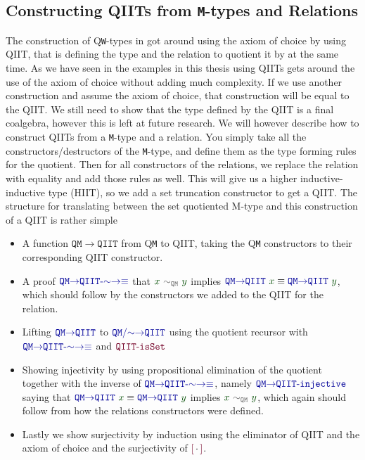 \documentclass[twoside,11pt,openright]{report}
\theoremstyle{plain} %
\theoremstyle{definition}
\theoremstyle{remark}
\newcommand*{\term}[1]{\textcolor{green!30!black}{#1}} %
\newcommand*{\relation}[1]{\textcolor{gray!75!black}{\ensuremath{\mathtt{#1}}}}
\newcommand*{\function}[1]{\textcolor{blue!60!black}{\ensuremath{\mathtt{#1}}}}
\newcommand*{\constructor}[1]{\textcolor{purple!60!black}{\ensuremath{\mathtt{#1}}}}
\newcommand*{\quotientconstructor}[1]{\constructor{[}\,#1\,\constructor{]}}
\begin{document}
\subsection{Constructing QIITs from \texttt{M}-types and Relations}
The construction of Q\texttt{W}-types in \cite{DBLP:Constructing-QIITs} got around using the axiom of choice by using QIIT, that is defining the type and the relation to quotient it by at the same time. As we have seen in the examples in this thesis using QIITs gets around the use of the axiom of choice without adding much complexity. If we use another construction and assume the axiom of choice, that construction will be equal to the QIIT. We still need to show that the type defined by the QIIT is a final coalgebra, however this is left at future research. We will however describe how to construct QIITs from a \texttt{M}-type and a relation. You simply take all the constructors/destructors of the \texttt{M}-type, and define them as the type forming rules for the quotient. Then for all constructors of the relations, we replace the relation with equality and add those rules as well. This will give us a higher inductive-inductive type (HIIT), so we add a set truncation constructor to get a QIIT. The structure for translating between the set quotiented M-type and this construction of a QIIT is rather simple
\begin{itemize}
\item A function \function{QM{\rightarrow}QIIT} from Q\texttt{M} to QIIT, taking the Q\texttt{M} constructors to their corresponding QIIT constructor.
\item A proof \(\function{QM{\rightarrow}QIIT\text{-}{\sim}{\rightarrow}{\equiv}}\) that \(\term{x}~\relation{\sim_{QM}}~\term{y}\) implies \(\function{QM{\rightarrow}QIIT}~\term{x} \equiv \function{QM{\rightarrow}QIIT}~\term{y}\), which should follow by the constructors we added to the QIIT for the relation.
\item Lifting \(\function{QM{\rightarrow}QIIT}\) to \(\function{QM/{\sim}{\rightarrow}QIIT}\) using the quotient recursor with \(\function{QM{\rightarrow}QIIT\text{-}{\sim}{\rightarrow}{\equiv}}\) and \(\constructor{QIIT\text{-}isSet}\)
\item Showing injectivity by using propositional elimination of the quotient together with the inverse of \(\function{QM{\rightarrow}QIIT\text{-}{\sim}{\rightarrow}{\equiv}}\), namely \(\function{QM{\rightarrow}QIIT\text{-}injective}\) saying that \(\function{QM{\rightarrow}QIIT}~\term{x} \equiv \function{QM{\rightarrow}QIIT}~\term{y}\) implies \(\term{x}~\relation{\sim_{QM}}~\term{y}\), which again should follow from how the relations constructors were defined.
\item Lastly we show surjectivity by induction using the eliminator of QIIT and the axiom of choice and the surjectivity of \(\quotientconstructor{{\cdot}}\).
\end{itemize}
\end{document}
